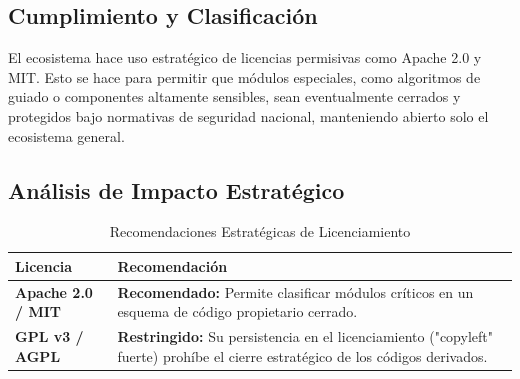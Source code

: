 \subsection{Cumplimiento y Clasificaci\'on}
El ecosistema hace uso estratégico de licencias permisivas como Apache 2.0 y MIT. Esto se hace para permitir que módulos especiales, como algoritmos de guiado o componentes altamente sensibles, sean eventualmente cerrados y protegidos bajo normativas de seguridad nacional, manteniendo abierto solo el ecosistema general.

\subsection{An\'alisis de Impacto Estrat\'egico}
\begin{table}[H]
\centering
\caption{Recomendaciones Estratégicas de Licenciamiento}
\begin{tabular}{|l|p{8cm}|}
\hline
\textbf{Licencia} & \textbf{Recomendación} \\ \hline
\textbf{Apache 2.0 / MIT} & \textbf{Recomendado:} Permite clasificar módulos críticos en un esquema de código propietario cerrado. \\ \hline
\textbf{GPL v3 / AGPL} & \textbf{Restringido:} Su persistencia en el licenciamiento ("copyleft" fuerte) prohíbe el cierre estratégico de los códigos derivados. \\ \hline
\end{tabular}
\end{table}


\newpage

